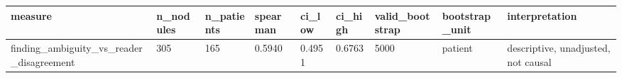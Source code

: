 \begin{tabular}{lllllllll}
\hline
measure & n\_nodules & n\_patients & spearman & ci\_low & ci\_high & valid\_bootstrap & bootstrap\_unit & interpretation \\
\hline
finding\_ambiguity\_vs\_reader\_disagreement & 305 & 165 & 0.5940 & 0.4951 & 0.6763 & 5000 & patient & descriptive, unadjusted, not causal \\
\hline
\end{tabular}
